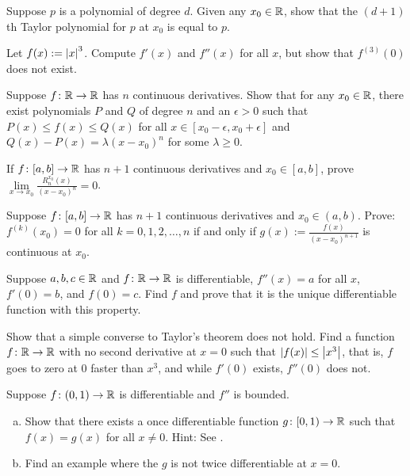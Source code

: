 \begin{exercise}
Suppose $p$ is a polynomial of degree $d$.  Given any $x_0 \in {\mathbb{R}}$,
show that
the $(d+1)$th Taylor polynomial for $p$ at $x_0$ is equal to $p$.
\end{exercise}

\begin{exercise}
Let $f(x) := \left\lvert {x} \right\rvert^3$.  Compute $f'(x)$ and $f''(x)$ for all $x$,
but show that $f^{(3)}(0)$ does not exist.
\end{exercise}

\begin{exercise}
Suppose $f \colon {\mathbb{R}} \to {\mathbb{R}}$ has $n$ continuous derivatives.  Show
that for any $x_0 \in {\mathbb{R}}$,
there exist polynomials $P$ and $Q$ of degree $n$ and 
an $\epsilon > 0$ such that $P(x) \leq f(x) \leq Q(x)$ for all $x \in
[x_0-\epsilon,x_0+\epsilon]$  and
$Q(x)-P(x) = \lambda {(x-x_0)}^n$ for some $\lambda \geq 0$.
\end{exercise}

\begin{exercise}
If $f \colon [a,b] \to {\mathbb{R}}$ has $n+1$ continuous derivatives
and $x_0 \in [a,b]$,
prove
$\lim\limits_{x\to x_0} \frac{R_n^{x_0}(x)}{{(x-x_0)}^n} = 0$.
\end{exercise}

\begin{exercise}
Suppose $f \colon [a,b] \to {\mathbb{R}}$ has $n+1$ continuous derivatives
and $x_0 \in (a,b)$.
Prove: $f^{(k)}(x_0) = 0$ for all $k = 0, 1, 2, \ldots, n$
if and only if $g(x) := \frac{f(x)}{{(x-x_0)}^{n+1}}$ is continuous at $x_0$.
\end{exercise}

\begin{exercise}
Suppose $a,b,c \in {\mathbb{R}}$ and $f \colon {\mathbb{R}} \to {\mathbb{R}}$ is differentiable,
$f''(x) = a$ for all $x$, $f'(0) = b$, and $f(0) = c$.  Find $f$ and prove that 
it is the unique differentiable function with this property.
\end{exercise}

\begin{exercise}[Challenging]
Show that a simple converse to Taylor's theorem does not hold.
Find a function $f \colon {\mathbb{R}} \to {\mathbb{R}}$ with no second derivative at $x=0$ such that
$\left\lvert {f(x)} \right\rvert \leq \left\lvert {x^3} \right\rvert$, that is, $f$ goes to zero at 0 faster than $x^3$, and
while $f'(0)$ exists, $f''(0)$ does not.
\end{exercise}

\begin{exercise} \label{exercise:extendboundedder2}
Suppose $f \colon (0,1) \to {\mathbb{R}}$ is differentiable and $f''$
is bounded.
\begin{enumerate}[a)]
\item
Show that there exists a once differentiable function $g \colon [0,1) \to {\mathbb{R}}$
such that $f(x) = g(x)$ for all $x \not= 0$.  Hint: 
See
.
\item
Find an example where the $g$ is not twice differentiable at $x=0$.
\end{enumerate}
\end{exercise}

